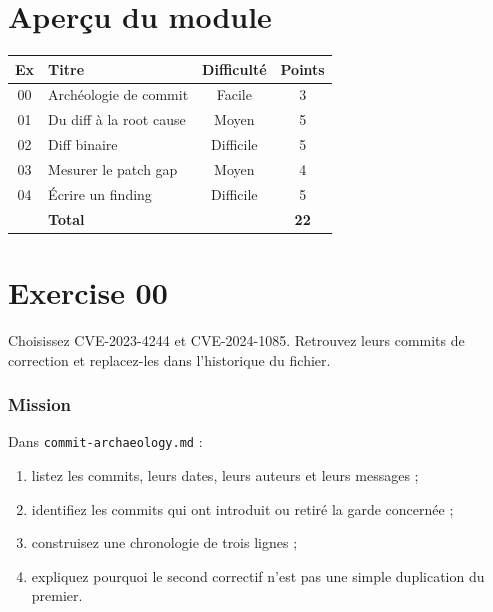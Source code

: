 \documentclass{training}
\begin{document}
\chapter{Aperçu du module}

\begin{center}
\begin{tabularx}{\linewidth}{|c|l|c|c|}
\hline
\textbf{Ex} & \textbf{Titre} & \textbf{Difficulté} & \textbf{Points} \\ \hline
00 & Archéologie de commit & Facile & 3 \\
01 & Du diff à la root cause & Moyen & 5 \\
02 & Diff binaire & Difficile & 5 \\
03 & Mesurer le patch gap & Moyen & 4 \\
04 & Écrire un finding & Difficile & 5 \\ \hline
& \textbf{Total} & & \textbf{22} \\ \hline
\end{tabularx}
\end{center}

\startexercices

\chapter{Exercise 00}
\makeheaderfiles

Choisissez CVE-2023-4244 et CVE-2024-1085. Retrouvez leurs commits de
correction et replacez-les dans l'historique du fichier.

\subsection*{Mission}

Dans \texttt{commit-archaeology.md} :

\begin{enumerate}
  \item listez les commits, leurs dates, leurs auteurs et leurs messages ;
  \item identifiez les commits qui ont introduit ou retiré la garde
        concernée ;
  \item construisez une chronologie de trois lignes ;
  \item expliquez pourquoi le second correctif n'est pas une simple
        duplication du premier.
\end{enumerate}
\end{document}
